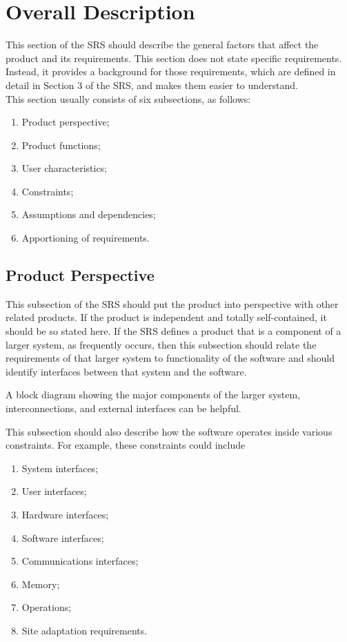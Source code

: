\documentclass{scrreprt}
\begin{document}
\chapter{Overall Description}
This section of the SRS should describe the general factors that affect the
product and its requirements. This section does not state specific requirements.
Instead, it provides a background for those requirements, which are defined in
detail in Section 3 of the SRS, and makes them easier to understand.\\
This section usually consists of six subsections, as follows:
\begin{enumerate}
	\item Product perspective;
	\item Product functions;
	\item User characteristics;
	\item Constraints;
	\item Assumptions and dependencies;
	\item Apportioning of requirements.
\end{enumerate}

\section{Product Perspective}
This subsection of the SRS should put the product into perspective with other
related products. If the product is independent and totally self-contained, it
should be so stated here. If the SRS defines a product that is a component of a
larger system, as frequently occurs, then this subsection should relate the
requirements of that larger system to functionality of the software and should
identify interfaces between that system and the software.

A block diagram showing the major components of the larger system,
interconnections, and external interfaces can be helpful.

This subsection should also describe how the software operates inside various
constraints. For example, these constraints could include
\begin{enumerate}
	\item System interfaces;
	\item User interfaces;
	\item Hardware interfaces;
	\item Software interfaces;
	\item Communications interfaces;
	\item Memory;
	\item Operations;
	\item Site adaptation requirements.
\end{enumerate}
\end{document}

